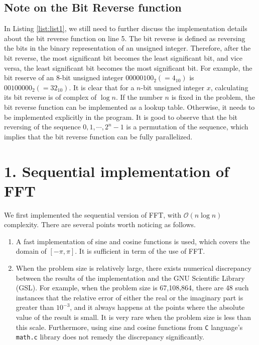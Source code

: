 \documentclass[amsmath,amssymb]{revtex4}
\begin{document}
\subsection{\label{subsec:subsec1.1}Note on the Bit Reverse function}
In Listing \ref{list:list1}, we still need to further discuss the implementation details about the bit reverse function on line 5. The bit reverse is defined as reversing the bits in the binary representation of an unsigned integer. Therefore, after the bit reverse, the most significant bit becomes the least significant bit, and vice versa, the least significant bit becomes the most significant bit. For example, the bit reserve of an 8-bit unsigned integer $00000100_2(=4_{10})$ is $00100000_2(=32_{10})$. It is clear that for a $n$-bit unsigned integer $x$, calculating its bit reverse is of complex of $\log n$. If the number $n$ is fixed in the problem, the bit reverse function can be implemented as a lookup table. Otherwise, it needs to be implemented explicitly in the program. It is good to observe that the bit reversing of the sequence $0, 1, \cdots, 2^n-1$ is a permutation of the sequence, which implies that the bit reverse function can be fully parallelized.

\section{\label{sec:sec1}1. Sequential implementation of FFT}
We first implemented the sequential version of FFT, with $\mathcal{O}(n\log n)$ complexity.
There are several points worth noticing as follows.
\begin{enumerate}
\item A fast implementation of sine and cosine functions is used, which covers the domain of $[-\pi, \pi]$. It is sufficient in term of the use of FFT.
\item When the problem size is relatively large, there exists numerical discrepancy between the results of the implementation and the GNU Scientific Library (GSL). For example, when the problem size is 67,108,864, there are 48 such instances that the relative error of either the real or the imaginary part is greater than $10^{-3}$, and it always happens at the points where the absolute value of the result is small. It is very rare when the problem size is less than this scale. Furthermore, using sine and cosine functions from {\tt C} language's {\tt math.c} library does not remedy the discrepancy significantly.
\end{enumerate}
\end{document}
